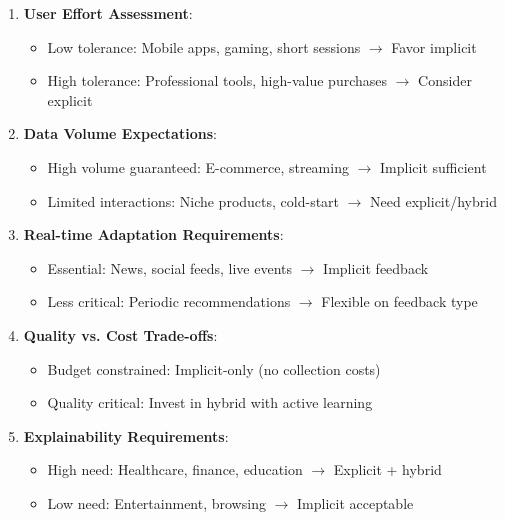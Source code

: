 \begin{enumerate}
    \item \textbf{User Effort Assessment}: 
    \begin{itemize}
        \item Low tolerance: Mobile apps, gaming, short sessions $\rightarrow$ Favor implicit
        \item High tolerance: Professional tools, high-value purchases $\rightarrow$ Consider explicit
    \end{itemize}
    
    \item \textbf{Data Volume Expectations}:
    \begin{itemize}
        \item High volume guaranteed: E-commerce, streaming $\rightarrow$ Implicit sufficient
        \item Limited interactions: Niche products, cold-start $\rightarrow$ Need explicit/hybrid
    \end{itemize}
    
    \item \textbf{Real-time Adaptation Requirements}:
    \begin{itemize}
        \item Essential: News, social feeds, live events $\rightarrow$ Implicit feedback
        \item Less critical: Periodic recommendations $\rightarrow$ Flexible on feedback type
    \end{itemize}
    
    \item \textbf{Quality vs. Cost Trade-offs}:
    \begin{itemize}
        \item Budget constrained: Implicit-only (no collection costs)
        \item Quality critical: Invest in hybrid with active learning
    \end{itemize}
    
    \item \textbf{Explainability Requirements}:
    \begin{itemize}
        \item High need: Healthcare, finance, education $\rightarrow$ Explicit + hybrid
        \item Low need: Entertainment, browsing $\rightarrow$ Implicit acceptable
    \end{itemize}
\end{enumerate}

